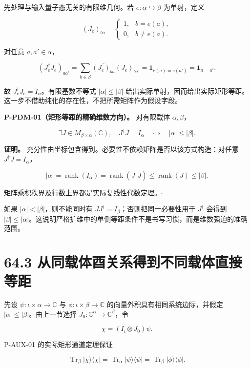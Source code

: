 \documentclass[
  11pt,
  oneside]{book}
\begin{document}
先处理与输入量子态无关的有限维几何。若 \(e:\alpha\hookrightarrow\beta\)
为单射，定义

\[
(J_e)_{ba}=\begin{cases}1,&b=e(a),\\0,&b\ne e(a).\end{cases}
\]

对任意 \(a,a'\in\alpha\)，

\[
(J_e^\dagger J_e)_{aa'}
=\sum_{b\in\beta}\overline{(J_e)_{ba}}(J_e)_{ba'}
=\mathbf1_{e(a)=e(a')}=\mathbf1_{a=a'}.
\]

故 \(J_e^\dagger J_e=I_\alpha\)。有限基数不等式 \(|\alpha|\le|\beta|\)
给出实际单射，因而给出实际矩形等距。这一步不借助纯化的存在性，不把所需矩阵作为假设字段。

\protect\hypertarget{p-pdm-01}{}{}

\textbf{P-PDM-01（矩形等距的精确维数方向）。} 对有限载体
\(\alpha,\beta\)，

\[
\exists J\in M_{\beta\times\alpha}(\mathbb C),\quad J^\dagger J=I_\alpha
\quad\Longleftrightarrow\quad |\alpha|\le|\beta|.
\]

\textbf{证明。}
充分性由坐标包含得到。必要性不依赖矩阵是否以该方式构造：对任意
\(J^\dagger J=I_\alpha\)，

\[
|\alpha|=\operatorname{rank}(I_\alpha)
=\operatorname{rank}(J^\dagger J)
\le\operatorname{rank}(J)\le|\beta|.
\]

矩阵乘积秩界及行数上界都是实际复线性代数定理。\(\square\)

如果 \(|\alpha|<|\beta|\)，则不能同时有
\(JJ^\dagger=I_\beta\)；否则把同一必要性用于 \(J^\dagger\) 会得到
\(|\beta|\le|\alpha|\)。这说明严格扩维中的单侧等距条件不是书写习惯，而是维数强迫的准确范围。

\section{64.3 从同载体酉关系得到不同载体直接等距}

先设 \(\psi:\iota\times\alpha\to\mathbb C\) 与
\(\phi:\iota\times\beta\to\mathbb C\) 的向量外积具有相同系统边际，并假定
\(|\alpha|\le|\beta|\)。由上一节选择
\(J_0:\mathbb C^\alpha\to\mathbb C^\beta\)，令

\[
\chi=(I_\iota\otimes J_0)\psi.
\]

P-AUX-01 的实际矩形通道定理保证

\[
\operatorname{Tr}_\beta |\chi\rangle\langle\chi|
=\operatorname{Tr}_\alpha|\psi\rangle\langle\psi|
=\operatorname{Tr}_\beta|\phi\rangle\langle\phi|.
\]
\end{document}
